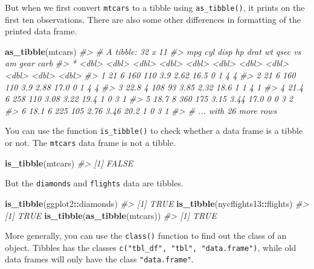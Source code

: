 \documentclass[]{book}
\newenvironment{Shaded}{\begin{snugshade}}{\end{snugshade}}
\newcommand{\CommentTok}[1]{\textcolor[rgb]{0.56,0.35,0.01}{\textit{#1}}}
\newcommand{\KeywordTok}[1]{\textcolor[rgb]{0.13,0.29,0.53}{\textbf{#1}}}
\newcommand{\NormalTok}[1]{#1}
\newcommand{\OperatorTok}[1]{\textcolor[rgb]{0.81,0.36,0.00}{\textbf{#1}}}
\theoremstyle{plain}
\theoremstyle{remark}
\begin{document}
But when we first convert \texttt{mtcars} to a tibble using \texttt{as\_tibble()}, it prints on the
first ten observations. There are also some other differences in formatting
of the printed data frame.

\begin{Shaded}
\begin{Highlighting}[]
\KeywordTok{as_tibble}\NormalTok{(mtcars)}
\CommentTok{#> # A tibble: 32 x 11}
\CommentTok{#>     mpg   cyl  disp    hp  drat    wt  qsec    vs    am  gear  carb}
\CommentTok{#> * <dbl> <dbl> <dbl> <dbl> <dbl> <dbl> <dbl> <dbl> <dbl> <dbl> <dbl>}
\CommentTok{#> 1  21       6   160   110  3.9   2.62  16.5     0     1     4     4}
\CommentTok{#> 2  21       6   160   110  3.9   2.88  17.0     0     1     4     4}
\CommentTok{#> 3  22.8     4   108    93  3.85  2.32  18.6     1     1     4     1}
\CommentTok{#> 4  21.4     6   258   110  3.08  3.22  19.4     1     0     3     1}
\CommentTok{#> 5  18.7     8   360   175  3.15  3.44  17.0     0     0     3     2}
\CommentTok{#> 6  18.1     6   225   105  2.76  3.46  20.2     1     0     3     1}
\CommentTok{#> # ... with 26 more rows}
\end{Highlighting}
\end{Shaded}

You can use the function \texttt{is\_tibble()} to check whether a data frame is a tibble or not.
The \texttt{mtcars} data frame is not a tibble.

\begin{Shaded}
\begin{Highlighting}[]
\KeywordTok{is_tibble}\NormalTok{(mtcars)}
\CommentTok{#> [1] FALSE}
\end{Highlighting}
\end{Shaded}

But the \texttt{diamonds} and \texttt{flights} data are tibbles.

\begin{Shaded}
\begin{Highlighting}[]
\KeywordTok{is_tibble}\NormalTok{(ggplot2}\OperatorTok{::}\NormalTok{diamonds)}
\CommentTok{#> [1] TRUE}
\KeywordTok{is_tibble}\NormalTok{(nycflights13}\OperatorTok{::}\NormalTok{flights)}
\CommentTok{#> [1] TRUE}
\KeywordTok{is_tibble}\NormalTok{(}\KeywordTok{as_tibble}\NormalTok{(mtcars))}
\CommentTok{#> [1] TRUE}
\end{Highlighting}
\end{Shaded}

More generally, you can use the \texttt{class()} function to find out the class of an
object. Tibbles has the classes \texttt{c("tbl\_df",\ "tbl",\ "data.frame")}, while old
data frames will only have the class \texttt{"data.frame"}.
\end{document}
